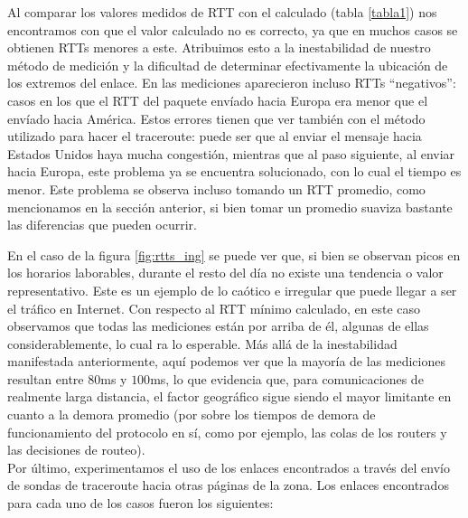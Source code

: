 Al comparar los valores medidos de RTT con el calculado (tabla \ref{tabla1}) nos encontramos con que el valor calculado no es correcto, ya que en muchos casos se obtienen RTTs menores a este. Atribuimos esto a la inestabilidad de nuestro método de medición y la dificultad de determinar efectivamente la ubicación de los extremos del enlace. En las mediciones aparecieron incluso RTTs ``negativos'': casos en los que el RTT del paquete envíado hacia Europa era menor que el envíado hacia América. Estos errores tienen que ver también con el método utilizado para hacer el traceroute: puede ser que al enviar el mensaje hacia Estados Unidos haya mucha congestión, mientras que al paso siguiente, al enviar hacia Europa, este problema ya se encuentra solucionado, con lo cual el tiempo es menor. Este problema se observa incluso tomando un RTT promedio, como mencionamos en la sección anterior, si bien tomar un promedio suaviza bastante las diferencias que pueden ocurrir.



En el caso de la figura \ref{fig:rtts_ing} se puede ver que, si bien se observan picos en los horarios laborables, durante el resto del día no existe una tendencia o valor representativo. Este es un ejemplo de lo caótico e irregular que puede llegar a ser el tráfico en Internet. Con respecto al RTT mínimo calculado, en este caso observamos que todas las mediciones están por arriba de él, algunas de ellas considerablemente, lo cual ra lo esperable. Más allá de la inestabilidad manifestada anteriormente, aquí podemos ver que la mayoría de las mediciones resultan entre $80$ms y $100$ms, lo que evidencia que, para comunicaciones de realmente larga distancia, el factor geográfico sigue siendo el mayor limitante en cuanto a la demora promedio (por sobre los tiempos de demora de funcionamiento del protocolo en sí, como por ejemplo, las colas de los routers y las decisiones de routeo).\\

Por último, experimentamos el uso de los enlaces encontrados a través del envío de sondas de traceroute hacia otras páginas de la zona. Los enlaces encontrados para cada uno de los casos fueron los siguientes:

